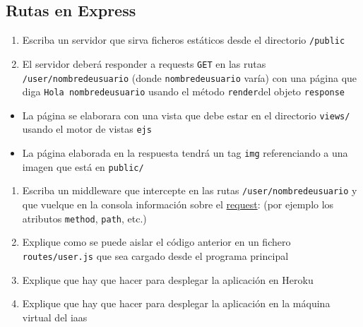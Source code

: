 \subsection{Rutas en Express}\label{rutas-en-express}

\begin{enumerate}
\def\labelenumi{\arabic{enumi}.}
\itemsep1pt\parskip0pt
\item
  Escriba un servidor que sirva ficheros estáticos desde el directorio
  \texttt{/public}
\item
  El servidor deberá responder a requests \texttt{GET} en las rutas
  \texttt{/user/nombredeusuario} (donde \texttt{nombredeusuario} varía)
  con una página que diga \texttt{Hola nombredeusuario} usando el método
  \texttt{render}del objeto \texttt{response}
\end{enumerate}

\begin{itemize}
\itemsep1pt\parskip0pt
\item
  La página se elaborara con una vista que debe estar en el directorio
  \texttt{views/} usando el motor de vistas \texttt{ejs}
\item
  La página elaborada en la respuesta tendrá un tag \texttt{img}
  referenciando a una imagen que está en \texttt{public/}
\end{itemize}

\begin{enumerate}
\def\labelenumi{\arabic{enumi}.}
\setcounter{enumi}{2}
\itemsep1pt\parskip0pt
\item
  Escriba un middleware que intercepte en las rutas
  \texttt{/user/nombredeusuario} y que vuelque en la consola información
  sobre el \href{https://expressjs.com/en/4x/api.html\#req}{request}:
  (por ejemplo los atributos \texttt{method}, \texttt{path}, etc.)
\item
  Explique como se puede aislar el código anterior en un fichero
  \texttt{routes/user.js} que sea cargado desde el programa principal
\item
  Explique que hay que hacer para desplegar la aplicación en Heroku
\item
  Explique que hay que hacer para desplegar la aplicación en la máquina
  virtual del iaas
\end{enumerate}

